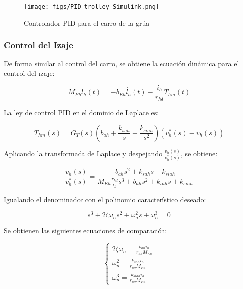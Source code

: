 \documentclass{article}
\begin{document}
            \begin{figure}[H]
                \centering
                \texttt{[image: figs/PID\_trolley\_Simulink.png]}
                \caption{Controlador PID para el carro de la grúa}
                \label{fig:pid_trolley_simulink}
            \end{figure}


        \subsubsection{Control del Izaje}

            De forma similar al control del carro, se obtiene la ecuación dinámica para el control del izaje:
            
            \begin{equation}
                M_{Eh} \ddot{l_h}(t) = -b_{Eh} \dot{l_h}(t) - \frac{i_h}{r_{hd}} T_{hm}(t)
            \end{equation}
            
            La ley de control PID en el dominio de Laplace es:
            
            \begin{equation}
                T_{hm}(s) = G_T(s) \left( b_{ah} + \frac{k_{sah}}{s} + \frac{k_{siah}}{s^2} \right) \left( v_h^*(s) - v_h(s) \right)
            \end{equation}
            
            Aplicando la transformada de Laplace y despejando \(\frac{v_h(s)}{v_h^*(s)}\), se obtiene:
            
            \begin{equation}
                \frac{v_h(s)}{v_h^*(s)} = \frac{b_{ah} s^2 + k_{sah} s + k_{siah}}{M_{Eh} \frac{r_{hd}}{i_h} s^3 + b_{ah} s^2 + k_{sah} s + k_{siah}}
            \end{equation}
            
            Igualando el denominador con el polinomio característico deseado:
            
            \begin{equation}
                s^3 + 2 \zeta \omega_n s^2 + \omega_n^2 s + \omega_n^3 = 0
            \end{equation}
            
            Se obtienen las siguientes ecuaciones de comparación:
            
            \begin{equation}
                \begin{cases}
                    2 \zeta \omega_n = \frac{b_{ah} i_h}{r_{hd} M_{Eh}} \\
                    \omega_n^2 = \frac{k_{sah} i_h}{r_{hd} M_{Eh}} \\
                    \omega_n^3 = \frac{k_{siah} i_h}{r_{hd} M_{Eh}}
                \end{cases}
            \end{equation}
            
\end{document}
